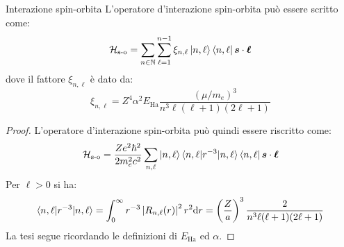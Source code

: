 \begin{proposition}{Interazione spin-orbita}{}
	L'operatore d'interazione spin-orbita può essere scritto come:
	\begin{equation}
		\mathcal{H}_\text{s-o} = \sum_{n \in \mathbb{N}} \sum_{\ell = 1}^{n - 1} \xi_{n,\ell} \ket{n,\ell} \bra{n,\ell} \boldsymbol{s} \cdot \boldsymbol{\ell}
		\label{eq:1.14}
	\end{equation}
	dove il fattore $ \xi_{n,\ell} $ è dato da:
	\begin{equation}
		\xi_{n,\ell} = Z^4 \alpha^2 E_\text{Ha} \frac{(\mu / m_e)^3}{n^3 \ell (\ell + 1) (2\ell + 1)}
		\label{eq:1.15}
	\end{equation}

	\tcblower

	\begin{proof}
		L'operatore d'interazione spin-orbita può quindi essere riscritto come:
		\begin{equation*}
			\mathcal{H}_\text{s-o} = \frac{Ze^2\hbar^2}{2m_e^2c^2} \sum_{n,\ell} \ket{n,\ell} \braket{n,\ell | r^{-3} | n,\ell} \bra{n,\ell} \boldsymbol{s} \cdot \boldsymbol{\ell}
		\end{equation*}
		Per $ \ell > 0 $ si ha:
		\begin{equation*}
			\braket{n,\ell | r^{-3} | n,\ell} = \int_0^\infty r^{-3} \left\lvert R_{n,\ell}(r)\right\rvert^2 r^2 \mathrm{d} r = \left( \frac{Z}{a} \right)^3 \frac{2}{n^3 \ell (\ell + 1) (2\ell + 1)}
		\end{equation*}
		La tesi segue ricordando le definizioni di $ E_\text{Ha} $ ed $ \alpha $.
	\end{proof}
\end{proposition}

